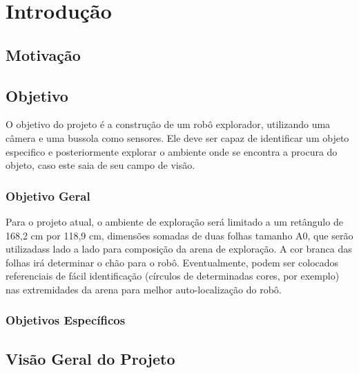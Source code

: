 \chapter{Introdução}


\section{Motivação}


\section{Objetivo}

O objetivo do projeto é a construção de um robô explorador, utilizando uma câmera e uma bussola como sensores. Ele deve ser capaz de identificar um objeto especifico e posteriormente explorar o ambiente onde se encontra a procura do objeto, caso este saia de seu campo de visão.

\subsection{Objetivo Geral}

Para o projeto atual, o ambiente de exploração será limitado a um retângulo de 168,2 cm por 118,9 cm, dimensões somadas de duas folhas tamanho A0, que serão utilizadass lado a lado para composição da arena de exploração. A cor branca das folhas irá determinar o chão para o robô. Eventualmente, podem ser colocados referenciais de fácil identificação (círculos de determinadas cores, por exemplo) nas extremidades da arena para melhor auto-localização do robô.


\subsection{Objetivos Específicos}


\section{Visão Geral do Projeto}
